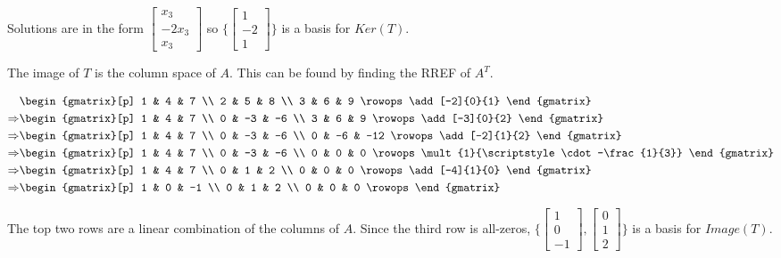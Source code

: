 Solutions are in the form $\begin{bmatrix} x_3 \\ -2x_3 \\ x_3 \end{bmatrix}$
so $\{\begin{bmatrix} 1 \\ -2 \\ 1 \end{bmatrix}\}$ is a basis for $Ker(T)$.\gap

The image of $T$ is the column space of $A$.
This can be found by finding the RREF of $A^T$.

\begin{align*}
    & \begin{gmatrix}[p]
        1 & 4 & 7 \\
        2 & 5 & 8 \\
        3 & 6 & 9 
        \rowops
        \add[-2]{0}{1}
      \end{gmatrix} \\
    \Rightarrow 
    & \begin{gmatrix}[p]
        1 & 4 & 7 \\
        0 & -3 & -6 \\
        3 & 6 & 9 
        \rowops
        \add[-3]{0}{2}
      \end{gmatrix} \\
    \Rightarrow 
    & \begin{gmatrix}[p]
        1 & 4 & 7 \\
        0 & -3 & -6 \\
        0 & -6 & -12 
        \rowops
        \add[-2]{1}{2}
    \end{gmatrix} \\
    \Rightarrow 
    & \begin{gmatrix}[p]
        1 & 4 & 7 \\
        0 & -3 & -6 \\
        0 & 0 & 0 
        \rowops
        \mult{1}{\scriptstyle \cdot -\frac{1}{3}}
    \end{gmatrix} \\
    \Rightarrow 
    & \begin{gmatrix}[p]
        1 & 4 & 7 \\
        0 & 1 & 2 \\
        0 & 0 & 0 
        \rowops
        \add[-4]{1}{0}
    \end{gmatrix} \\
    \Rightarrow 
    & \begin{gmatrix}[p]
        1 & 0 & -1 \\
        0 & 1 & 2 \\
        0 & 0 & 0 
        \rowops
    \end{gmatrix} \\
\end{align*}

The top two rows are a linear combination of the columns of $A$.
Since the third row is all-zeros, 
$\{\begin{bmatrix} 1 \\ 0 \\ -1 \end{bmatrix}, 
\begin{bmatrix} 0 \\ 1 \\ 2 \end{bmatrix}\}$
is a basis for $Image(T)$.

